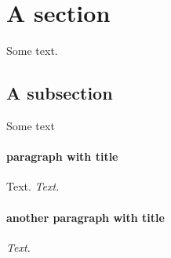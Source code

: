\section{A section}
\label{s:1}
Some text.

\subsection{A subsection}
\label{s:2}
Some text

\paragraph{paragraph with title}
Text.
\emph{Text.}

\paragraph{another paragraph with title}
\emph{Text.}

\setcounter{tocdepth}{3}
\tableofcontents
